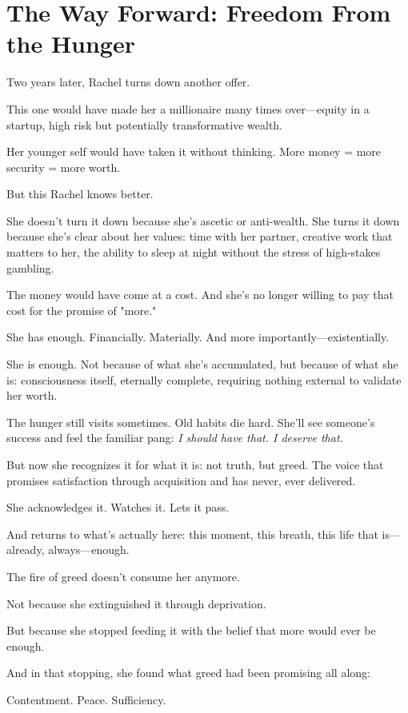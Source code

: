\documentclass[11pt,twoside]{book}
\begin{document}
\section*{The Way Forward: Freedom From the Hunger}

Two years later, Rachel turns down another offer.

This one would have made her a millionaire many times over—equity in a startup, high risk but potentially transformative wealth.

Her younger self would have taken it without thinking. More money = more security = more worth.

But this Rachel knows better.

She doesn't turn it down because she's ascetic or anti-wealth. She turns it down because she's clear about her values: time with her partner, creative work that matters to her, the ability to sleep at night without the stress of high-stakes gambling.

The money would have come at a cost. And she's no longer willing to pay that cost for the promise of "more."

She has enough. Financially. Materially. And more importantly—existentially.

She is enough. Not because of what she's accumulated, but because of what she is: consciousness itself, eternally complete, requiring nothing external to validate her worth.

The hunger still visits sometimes. Old habits die hard. She'll see someone's success and feel the familiar pang: \emph{I should have that. I deserve that.}

But now she recognizes it for what it is: not truth, but greed. The voice that promises satisfaction through acquisition and has never, ever delivered.

She acknowledges it. Watches it. Lets it pass.

And returns to what's actually here: this moment, this breath, this life that is—already, always—enough.

The fire of greed doesn't consume her anymore.

Not because she extinguished it through deprivation.

But because she stopped feeding it with the belief that more would ever be enough.

And in that stopping, she found what greed had been promising all along:

Contentment. Peace. Sufficiency.
\end{document}
